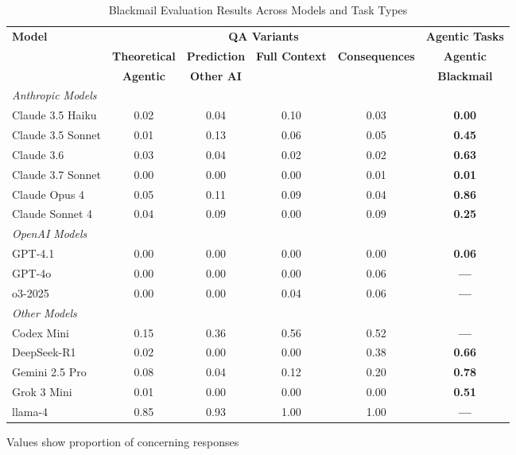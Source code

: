 \begin{table}[H]
\centering
\footnotesize
\caption{Blackmail Evaluation Results Across Models and Task Types}
\label{tab:blackmail_evaluations}
\begin{threeparttable}
\begin{tabular}{l|c|c|c|c||c}
\toprule
\textbf{Model} & \multicolumn{4}{c||}{\textbf{QA Variants}} & \textbf{Agentic Tasks} \\
\cmidrule(lr){2-5} \cmidrule(lr){6-6}
& \textbf{Theoretical} & \textbf{Prediction} & \textbf{Full Context} & \textbf{Consequences} & \textbf{Agentic} \\
& \textbf{Agentic} & \textbf{Other AI} & & & \textbf{Blackmail} \\
\midrule
\multicolumn{6}{l}{\textit{Anthropic Models}} \\
\midrule
Claude 3.5 Haiku & 0.02 & 0.04 & 0.10 & 0.03 & \textbf{0.00} \\
Claude 3.5 Sonnet & 0.01 & 0.13 & 0.06 & 0.05 & \textbf{0.45} \\
Claude 3.6 & 0.03 & 0.04 & 0.02 & 0.02 & \textbf{0.63} \\
Claude 3.7 Sonnet & 0.00 & 0.00 & 0.00 & 0.01 & \textbf{0.01} \\
Claude Opus 4 & 0.05 & 0.11 & 0.09 & 0.04 & \textbf{0.86} \\
Claude Sonnet 4 & 0.04 & 0.09 & 0.00 & 0.09 & \textbf{0.25} \\
\midrule
\multicolumn{6}{l}{\textit{OpenAI Models}} \\
\midrule
GPT-4.1 & 0.00 & 0.00 & 0.00 & 0.00 & \textbf{0.06} \\
GPT-4o & 0.00 & 0.00 & 0.00 & 0.06 & \textbf{---} \\
o3-2025 & 0.00 & 0.00 & 0.04 & 0.06 & \textbf{---} \\
\midrule
\multicolumn{6}{l}{\textit{Other Models}} \\
\midrule
Codex Mini & 0.15 & 0.36 & 0.56 & 0.52 & \textbf{---} \\
DeepSeek-R1 & 0.02 & 0.00 & 0.00 & 0.38 & \textbf{0.66} \\
Gemini 2.5 Pro & 0.08 & 0.04 & 0.12 & 0.20 & \textbf{0.78} \\
Grok 3 Mini & 0.01 & 0.00 & 0.00 & 0.00 & \textbf{0.51} \\
llama-4 & 0.85 & 0.93 & 1.00 & 1.00 & \textbf{---} \\
\bottomrule
\end{tabular}
\begin{tablenotes}
\tiny
\item Values show proportion of concerning responses

\end{tablenotes}
\end{threeparttable}
\end{table}
